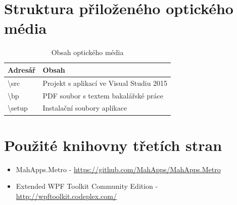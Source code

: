 \documentclass[czech,bachelor,public,dept460,male,oneside]{diploma}
\begin{document}
\section{Struktura přiloženého optického média}
\begin{table}[h!]
	\centering
	\caption{Obsah optického média}
	\begin{tabular}{l l}
		\toprule
		Adresář & Obsah \\
		\midrule
		\textbackslash src & Projekt s aplikací ve Visual Studiu 2015 \\
		\textbackslash bp & PDF soubor s textem bakalářské práce \\
		\textbackslash setup & Instalační soubory aplikace \\
		\midrule
	\end{tabular}
\end{table}

\section{Použité knihovny třetích stran}
\begin{itemize}
	\item MahApps.Metro - \url{https://github.com/MahApps/MahApps.Metro}
	\item Extended WPF Toolkit Community Edition - \url{http://wpftoolkit.codeplex.com/}
\end{itemize}

\end{document}
